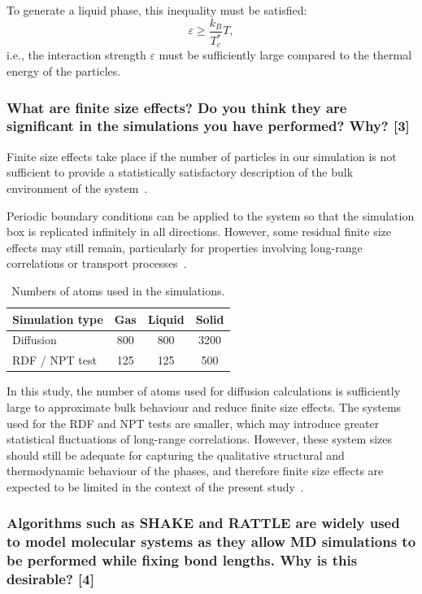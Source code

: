 \documentclass[a4paper,10pt,twocolumn]{article}
\begin{document}
To generate a liquid phase, this inequality must be satisfied:
\[
\varepsilon\ge\frac{k_B}{T^*_c}T,
\]
i.e., the interaction strength $\varepsilon$ must be sufficiently large compared to the thermal energy of the particles.

\subsubsection*{What are finite size effects? Do you think they are significant in the simulations you have performed? Why? [3]}

Finite size effects take place if the number of particles in our simulation is not sufficient to provide a statistically satisfactory description of the bulk environment of the system~\cite{reible2023finite}. 

Periodic boundary conditions can be applied to the system so that the simulation box is replicated infinitely in all directions. However, some residual finite size effects may still remain, particularly for properties involving long-range correlations or transport processes~\cite{allen2017computer}.

\begin{table}[H]
\centering
\caption{Numbers of atoms used in the simulations.}
\label{tab:atom_numbers}
\begin{tabular}{lccc}
\toprule
Simulation type & Gas & Liquid & Solid \\
\midrule
Diffusion & 800 & 800 & 3200 \\
RDF / NPT test & 125 & 125 & 500 \\
\bottomrule
\end{tabular}
\end{table}

In this study, the number of atoms used for diffusion calculations is sufficiently large to approximate bulk behaviour and reduce finite size effects. The systems used for the RDF and NPT tests are smaller, which may introduce greater statistical fluctuations of long-range correlations. However, these system sizes should still be adequate for capturing the qualitative structural and thermodynamic behaviour of the phases, and therefore finite size effects are expected to be limited in the context of the present study~\cite{frenkel2023understanding}.

\subsubsection*{Algorithms such as SHAKE and RATTLE are widely used to model molecular systems as they allow MD simulations to be performed while fixing bond lengths. Why is this desirable? [4]}
\end{document}
